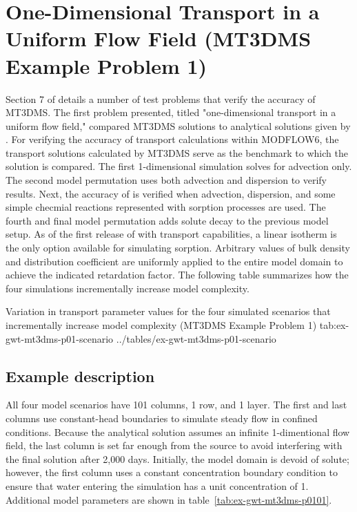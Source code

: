 \section{One-Dimensional Transport in a Uniform Flow Field (MT3DMS Example Problem 1)}

Section 7 of \cite{zheng1999mt3dms} details a number of test problems that verify the accuracy of MT3DMS.  The first problem presented, titled "one-dimensional transport in a uniform flow field," compared MT3DMS solutions to analytical solutions given by \cite{vanGenuchtenAlves1982}.  For verifying the accuracy of transport calculations within MODFLOW6, the transport solutions calculated by MT3DMS serve as the benchmark to which the \mf solution is compared.  The first 1-dimensional simulation solves for advection only.  The second model permutation uses both advection and dispersion to verify \mf results.  Next, the accuracy of \mf is verified when advection, dispersion, and some simple checmial reactions represented with sorption processes are used.  The fourth and final model permutation adds solute decay to the previous model setup. As of the first release of \mf with transport capabilities, a linear isotherm is the only option available for simulating sorption. Arbitrary values of bulk density and distribution coefficient are uniformly applied to the entire model domain to achieve the indicated retardation factor. The following table summarizes how the four simulations incrementally increase model complexity.

\begin{ScenarioTable}{
       Variation in transport parameter values for the four simulated scenarios that incrementally increase model complexity (MT3DMS Example Problem 1)}
       {tab:ex-gwt-mt3dms-p01-scenario}
       {../tables/ex-gwt-mt3dms-p01-scenario}
\end{ScenarioTable}

\subsection{Example description}

All four model scenarios have 101 columns, 1 row, and 1 layer. The first and last columns use constant-head boundaries to simulate steady flow in confined conditions. Because the analytical solution assumes an infinite 1-dimentional flow field, the last column is set far enough from the source to avoid interfering with the final solution after 2,000 days. Initially, the model domain is devoid of solute; however, the first column uses a constant concentration boundary condition to ensure that water entering the simulation has a unit concentration of 1. Additional model parameters are shown in table~\ref{tab:ex-gwt-mt3dms-p0101}.

